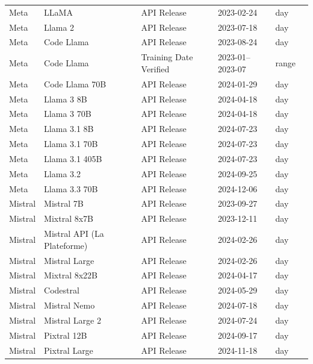 \documentclass[sigconf]{acmart}
\begin{document}
\begin{longtable}{p{2.2cm} p{3.4cm} p{3.0cm} p{2.3cm} p{1.6cm} p{2.0cm}}
Meta & LLaMA & API Release & 2023-02-24 & day & \cite{meta_llama_2023} \\
Meta & Llama 2 & API Release & 2023-07-18 & day & \cite{meta_llama2_2023} \\
Meta & Code Llama & API Release & 2023-08-24 & day & \cite{meta_code_llama_2023} \\
Meta & Code Llama & Training Date Verified & 2023-01--2023-07 & range & \cite{meta_code_llama_paper_2023} \\
Meta & Code Llama 70B & API Release & 2024-01-29 & day & \cite{meta_code_llama_2023} \\
Meta & Llama 3 8B & API Release & 2024-04-18 & day & \cite{meta_llama3_2024} \\
Meta & Llama 3 70B & API Release & 2024-04-18 & day & \cite{meta_llama3_2024} \\
Meta & Llama 3.1 8B & API Release & 2024-07-23 & day & \cite{meta_llama3_1_2024} \\
Meta & Llama 3.1 70B & API Release & 2024-07-23 & day & \cite{meta_llama3_1_2024} \\
Meta & Llama 3.1 405B & API Release & 2024-07-23 & day & \cite{meta_llama3_1_2024} \\
Meta & Llama 3.2 & API Release & 2024-09-25 & day & \cite{meta_llama3_2_2024} \\
Meta & Llama 3.3 70B & API Release & 2024-12-06 & day & \cite{huggingface_llama3_3_70b_2024} \\

Mistral & Mistral 7B & API Release & 2023-09-27 & day & \cite{mistral_mistral7b_2023} \\
Mistral & Mixtral 8x7B & API Release & 2023-12-11 & day & \cite{mistral_mixtral_8x7b_2023} \\
Mistral & Mistral API (La Plateforme) & API Release & 2024-02-26 & day & \cite{mistral_la_plateforme_2024} \\
Mistral & Mistral Large & API Release & 2024-02-26 & day & \cite{mistral_mistral_large_2024} \\
Mistral & Mixtral 8x22B & API Release & 2024-04-17 & day & \cite{mistral_mixtral_8x22b_2024} \\
Mistral & Codestral & API Release & 2024-05-29 & day & \cite{mistral_codestral_2024} \\
Mistral & Mistral Nemo & API Release & 2024-07-18 & day & \cite{mistral_nemo_2024} \\
Mistral & Mistral Large 2 & API Release & 2024-07-24 & day & \cite{mistral_mistral_large_2_2024} \\
Mistral & Pixtral 12B & API Release & 2024-09-17 & day & \cite{mistral_pixtral_12b_2024} \\
Mistral & Pixtral Large & API Release & 2024-11-18 & day & \cite{mistral_pixtral_large_2024} \\

\end{longtable}
\end{document}
